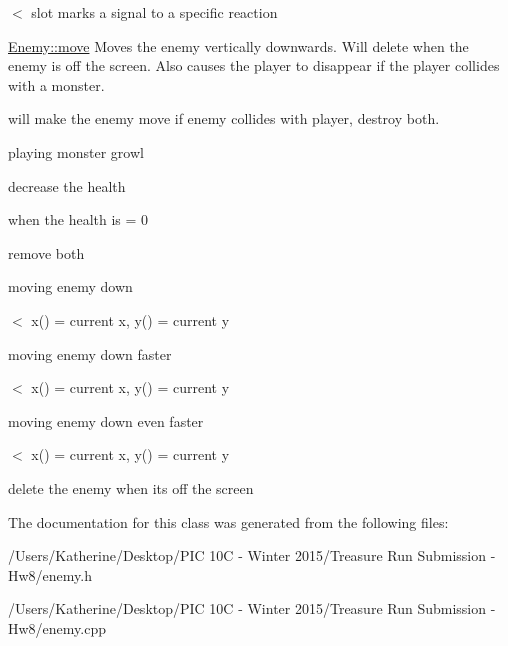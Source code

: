 $<$ slot marks a signal to a specific reaction 

\hyperlink{class_enemy_a9a398f8d12234f02563b27440aff7891}{Enemy\+::move} Moves the enemy vertically downwards. Will delete when the enemy is off the screen. Also causes the player to disappear if the player collides with a monster.

will make the enemy move if enemy collides with player, destroy both.

playing monster growl

decrease the health

when the health is = 0

remove both

moving enemy down

$<$ x() = current x, y() = current y

moving enemy down faster

$<$ x() = current x, y() = current y

moving enemy down even faster

$<$ x() = current x, y() = current y

delete the enemy when it\textquotesingle{}s off the screen 

The documentation for this class was generated from the following files\+:\begin{DoxyCompactItemize}
\item 
/\+Users/\+Katherine/\+Desktop/\+P\+I\+C 10\+C -\/ Winter 2015/\+Treasure Run Submission -\/ Hw8/enemy.\+h\item 
/\+Users/\+Katherine/\+Desktop/\+P\+I\+C 10\+C -\/ Winter 2015/\+Treasure Run Submission -\/ Hw8/enemy.\+cpp\end{DoxyCompactItemize}
